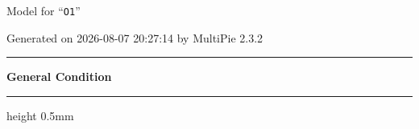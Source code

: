 \documentclass[fleqn,10pt,landscape]{jsarticle}
\begin{document}
\setcounter{MaxMatrixCols}{32}

\renewcommand{\tablename}{Table~}
\renewcommand{\figurename}{Figure~}
\setlength{\baselineskip}{16pt}
\setlength{\parindent}{0pt}
\setlength{\mathindent}{0pt}
\footnotesize
\begin{center}
\LARGE
Model for ``\texttt{O1}''
\end{center}
\begin{flushright}
Generated on 2026-08-07 20:27:14 by MultiPie 2.3.2
\end{flushright}
\setlength{\baselineskip}{16pt}
\footnotesize
\vspace{5mm}
\noindent \rule[0.5mm]{5mm}{0.5mm}\hspace{3mm}\textbf{General Condition}\hspace{3mm}\leaders\hrule height 0.5mm\hfill\kern0pt
\vspace{3mm}
\end{document}
